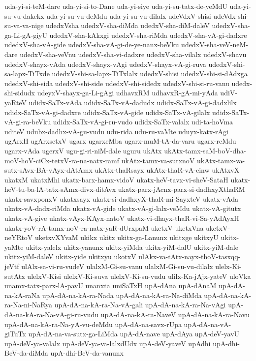 {uda-yi-si-teM-dare
uda-yi-si-to-Dane
uda-yi-siye
uda-yi-su-tatx-de-yeMdU
uda-yi-su-vu-dakekx
uda-yi-su-vu-deMdu
uda-yi-su-vu-dilalx
udeVdxV-shisi
udeVdx-shi-su-va-va-nige
udedxVsha
udedxV-sha-diMda
udedxV-sha-diM-daleV
udedxV-sha-ga-Li-gA-giyU
udedxV-sha-kAkxgi
udedxV-sha-riMda
udedxV-sha-vA-gi-dadxre
udedxV-sha-vA-gide
udedxV-sha-vA-gi-de-ye-nanx-beVku
udedxV-sha-veV-neM-dare
udedxV-sha-veVnu
udedxV-sha-vi-dadxre
udedxV-sha-vilalx
udedxV-shavu
udedxV-shayx-vAda
udedxV-shayx-vAgi
udedxV-shayx-vA-gi-ruva
udedxV-shi-sa-lapx-TiTxde
udedxV-shi-sa-lapx-TiTxlalx
udedxV-shisi
udedxV-shi-si-dAdxga
udedxV-shi-sida
udedxV-shi-side
udedxV-shi-sidedx
udedxV-shi-si-ru-vanu
udedx-shi-sidudx
udeyxV-shayx-ga-Li-gAgi
udhavxRM
udhavxR-gA-mi-yAda
udiV-yaRteV
udidx-SaTx-vAda
udidx-SaTx-vA-dadudx
udidx-SaTx-vA-gi-dadxlilx
udidx-SaTx-vA-gi-dadxre
udidx-SaTx-vA-gide
udidx-SaTx-vA-gilalx
udidx-SaTx-vA-gi-ra-beVku
udidx-SaTx-vA-gi-ru-vudo
udidx-SaTx-valalx
udi-ta-hoVma
uditeV
udubx-dadhx-vA-gu-vudu
udu-rida
udu-ru-vaMte
uduyx-katx-rAgi
ugArxH
ugArxsetxV
ugarx
ugarxeMba
ugarx-muM-tA-da-varu
ugarx-reMdu
ugarx-vAda
ugerxV
ugu-gi-ri-niM-dale
uguru
ukAtx
ukAtx-tamx-saM-boV-dha-moV-hoV-ciCx-tetxV-ra-na-natx-ramf
ukAtx-tamx-va-sutxnoV
ukAtx-tamx-va-sutx-sAvx-BA-vAyx-dAtAmx
ukAtx-thaRsayx
ukAtx-thaR-vA-cinw
ukAtxvX
ukatxM
ukatxMhi
ukatx-barx-hamx-vidoV
ukatx-heV-tavx-vi-sheV-SataH
ukatx-heV-tu-ba-lA-tatx-sAmx-divx-ditAvx
ukatx-parx-jAcnx-parx-si-dadhxyXthaRM
ukatx-savxponxV
ukatxsayx
ukatx-si-dadhxyX-thaR-mi-SayxteV
ukatx-vAda
ukatx-vA-dadx-riMda
ukatx-vA-gide
ukatx-vA-gi-lalx-veMdu
ukatx-vA-gitutx
ukatx-vA-give
ukatx-vAyx-KAyx-natoV
ukatx-vi-dhayx-thaR-vi-Sa-yAdAyxH
ukatx-yoV-rA-tamx-noV-ra-natx-yaR-dUrxpaM
uketxV
uketxVna
uketxV-neYRtoV
uketxvXYvaM
ukikx
ukitx
ukitx-ga-Lanunx
ukitxge
ukitxyU
ukitx-yaMte
ukitx-yalelx
ukitx-yanunx
ukitx-yiMda
ukitx-yiM-dalU
ukitx-yiM-dale
ukitx-yiM-daleV
ukitx-yide
ukitxyu
ukotxV
ulAkx-va-tAtx-nayx-thoV-tasxqq-jeVtf
ulAlx-sa-vi-ru-vudeV
ulalxM-Gi-su-vanu
ulalxM-Gi-su-vu-dilalx
ulelx-Ki-sutAtx
ulelxV-Kisi
ulelxV-Ki-suva
ulelxV-Ki-su-vudu
ulilx-Ka-jAjx-yateV
uloVka
unamx-tatx-parx-lA-pavU
unanxta
uniSaTxH
upA-dAna
upA-dAnaM
upA-dA-na-kA-raNa
upA-dA-na-kA-ra-Nada
upA-dA-na-kA-ra-Na-diMda
upA-dA-na-kA-ra-Na-ni-NaRya
upA-dA-na-kA-ra-Na-vA-gali
upA-dA-na-kA-ra-Na-vAgi
upA-dA-na-kA-ra-Na-vA-gi-ru-vudu
upA-dA-na-kA-ra-NaveV
upA-dA-na-kA-ra-Navu
upA-dA-na-kA-ra-Na-yA-vu-deMdu
upA-dA-na-savx-rUpa
upA-dA-na-vA-giTuTx
upA-dA-na-va-sutx-ga-LiMda
upA-dA-nave
upA-dAya
upA-deV-yavU
upA-deV-ya-valalx
upA-deV-ya-va-lalxdUdx
upA-deV-yaveV
upAdhi
upA-dhi-BeV-da-diMda
upA-dhi-BeV-da-vanunx
}
